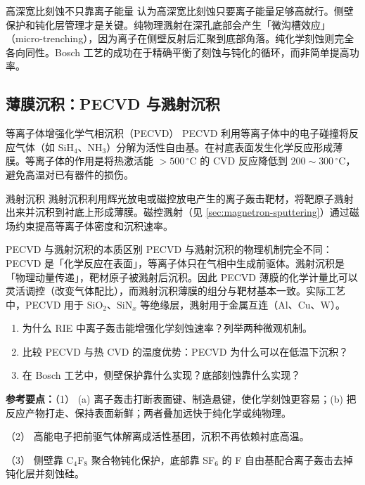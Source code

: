 \documentclass[12pt,a4paper,openany,oneside]{book}
\newcommand{\quizans}[1]{\par\medskip{\color{figGray}\rule{\linewidth}{0.3pt}}\par\smallskip
  {\footnotesize\textbf{参考要点：}#1}}
\begin{document}
\begin{warning}{高深宽比刻蚀不只靠离子能量}{}
认为高深宽比刻蚀只要离子能量足够高就行。侧壁保护和钝化层管理才是关键。纯物理溅射在深孔底部会产生「微沟槽效应」（micro-trenching），因为离子在侧壁反射后汇聚到底部角落。纯化学刻蚀则完全各向同性。Bosch 工艺的成功在于精确平衡了刻蚀与钝化的循环，而非简单提高功率。
\end{warning}

\subsection{薄膜沉积：PECVD 与溅射沉积}

\begin{definition}{等离子体增强化学气相沉积（PECVD）}{}{}
\label{def:pecvd}
PECVD 利用等离子体中的电子碰撞将反应气体（如 $\mathrm{SiH}_4$、$\mathrm{NH}_3$）分解为活性自由基。在衬底表面发生化学反应形成薄膜。等离子体的作用是将热激活能 $> 500\,\mathrm{^\circ C}$ 的 CVD 反应降低到 $200\sim 300\,\mathrm{^\circ C}$，避免高温对已有器件的损伤。
\end{definition}

\begin{definition}{溅射沉积}{}{}
\label{def:sputter-deposition}
溅射沉积利用辉光放电或磁控放电产生的离子轰击靶材，将靶原子溅射出来并沉积到衬底上形成薄膜。磁控溅射（见 \cref{sec:magnetron-sputtering}）通过磁场约束提高等离子体密度和沉积速率。
\end{definition}

\begin{insight}{PECVD 与溅射沉积的本质区别}{}
PECVD 与溅射沉积的物理机制完全不同：PECVD 是「化学反应在表面」，等离子体只在气相中生成前驱体。溅射沉积是「物理动量传递」，靶材原子被溅射后沉积。因此 PECVD 薄膜的化学计量比可以灵活调控（改变气体配比），而溅射沉积薄膜的组分与靶材基本一致。实际工艺中，PECVD 用于 $\mathrm{SiO}_2$、$\mathrm{SiN}_x$ 等绝缘层，溅射用于金属互连（Al、Cu、W）。
\end{insight}

\begin{miniquiz}
\begin{enumerate}
\item 为什么 RIE 中离子轰击能增强化学刻蚀速率？列举两种微观机制。
\item 比较 PECVD 与热 CVD 的温度优势：PECVD 为什么可以在低温下沉积？
\item 在 Bosch 工艺中，侧壁保护靠什么实现？底部刻蚀靠什么实现？
\end{enumerate}
\quizans{（1） (a) 离子轰击打断表面键、制造悬键，使化学刻蚀更容易；(b) 把反应产物打走、保持表面新鲜；两者叠加远快于纯化学或纯物理。\par （2） 高能电子把前驱气体解离成活性基团，沉积不再依赖衬底高温。\par （3） 侧壁靠 C$_4$F$_8$ 聚合物钝化保护，底部靠 SF$_6$ 的 F 自由基配合离子轰击去掉钝化层并刻蚀硅。}
\end{miniquiz}
\end{document}
